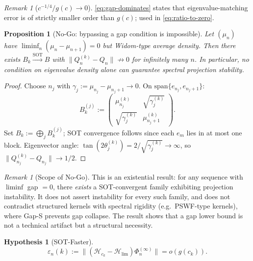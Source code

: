 \documentclass[12pt,a4paper]{amsart}
\newtheorem{proposition}[theorem]{Proposition}
\newtheorem{hypothesis}[theorem]{Hypothesis}
\theoremstyle{definition}
\theoremstyle{remark}
\newtheorem{remark}[theorem]{Remark}
\newcommand{\Hlim}{\mathcal{H}_{\lim}}
\begin{document}
\begin{remark}[$c^{-1/4}/g(c)\to 0$]
\label{rem:gap-implies-o}
\eqref{eq:gap-dominates} states that
eigenvalue-matching error is of strictly
smaller order than $g(c)$;
used in \eqref{eq:ratio-to-zero}.
\end{remark}

\begin{proposition}[No-Go: bypassing
  a gap condition is impossible]
\label{prop:no-go}
Let $(\mu_n)$ have
$\liminf_n(\mu_n-\mu_{n+1})=0$
but Widom-type average density.
Then there exists
$B_k\xrightarrow{\mathrm{SOT}} B$
with $\|Q_n^{(k)}-Q_n\|\not\to 0$
for infinitely many $n$.
In particular, no condition on
eigenvalue density alone can guarantee
spectral projection stability.
\end{proposition}
\begin{proof}
Choose $n_j$ with
$\gamma_j:=\mu_{n_j}-\mu_{n_j+1}\to 0$.
On $\mathrm{span}\{e_{n_j},e_{n_j+1}\}$:
\[
  B_k^{(j)}:=
  \begin{pmatrix}
    \mu_{n_j}^{(k)} & \sqrt{\gamma_j^{(k)}}\\
    \sqrt{\gamma_j^{(k)}} & \mu_{n_j+1}^{(k)}
  \end{pmatrix}.
\]
Set $B_k:=\bigoplus_j B_k^{(j)}$;
SOT convergence follows since each $e_m$
lies in at most one block.
Eigenvector angle:
$\tan(2\theta_j^{(k)})
=2/\sqrt{\gamma_j^{(k)}}\to\infty$,
so $\|Q_{n_j}^{(k)}-Q_{n_j}\|\to 1/2$.
\end{proof}

\begin{remark}[Scope of No-Go]
\label{rem:no-go-scope}
This is an existential result:
for any sequence with $\liminf$ gap $=0$,
there \emph{exists} a SOT-convergent
family exhibiting projection instability.
It does not assert instability for
every such family, and does not
contradict structured kernels with
spectral rigidity (e.g.\ PSWF-type
kernels), where Gap-S prevents gap
collapse.
The result shows that a gap lower bound
is not a technical artifact but a
structural necessity.
\end{remark}

\begin{hypothesis}[SOT-Faster]
\label{hyp:sot-faster}
\begin{equation}\label{eq:sot-faster}
  \varepsilon_n(k)
  :=\|(\mathcal{H}_{c_k}-\Hlim)
  \Phi_n^{(\infty)}\|
  = o(g(c_k)).
\end{equation}
\end{hypothesis}
\end{document}
